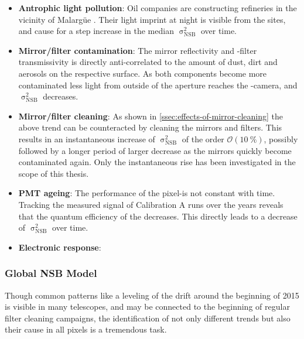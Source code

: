 \begingroup
\renewcommand\arraystretch{2}
\vspace{0.2cm}
\begin{itemize}
\item \textbf{Antrophic light pollution}: Oil companies are constructing 
refineries in the vicinity of Malargüe \cite{mineroSeguroFlagshipProject2026}. 
Their light imprint at night is visible from the \FD sites, and cause for a 
step increase in the median $\upsigma^2_\mathrm{NSB}$ over time.

\item \textbf{Mirror/filter contamination}: The mirror reflectivity and 
\UV-filter transmissivity is directly anti-correlated to the amount of dust, 
dirt and aerosols on the respective surface. As both components become more 
contaminated less light from outside of the aperture reaches the \FD-camera, 
and $\upsigma^2_\mathrm{NSB}$ decreases.

\item \textbf{Mirror/filter cleaning}: As shown in 
\cref{ssec:effects-of-mirror-cleaning} the above trend can be counteracted by
cleaning the \FD mirrors and filters. This results in an instantaneous increase
of $\upsigma^2_\mathrm{NSB}$ of the order $\mathcal{O}(\SI{10}{\percent})$, 
possibly followed by a longer period of larger decrease as the mirrors quickly 
become contaminated again. Only the instantaneous rise has been investigated in
the scope of this thesis.

\item \textbf{PMT ageing}: The performance of the pixel-\PMTs is not constant 
with time. Tracking the measured signal of Calibration A runs over the years
reveals that the quantum efficiency of the \PMTs decreases. This directly leads
to a decrease of $\upsigma^2_\mathrm{NSB}$ over time.

\item \textbf{Electronic response}: 

\end{itemize}
\vspace{0.2cm}
\endgroup

\subsubsection{Global NSB Model}

Though common patterns like a leveling of the \NSB drift around the beginning
of 2015 is visible in many telescopes, and may be connected to the beginning of
regular filter cleaning campaigns, the identification of not only different 
trends but also their cause in all \FD pixels is a tremendous task.

